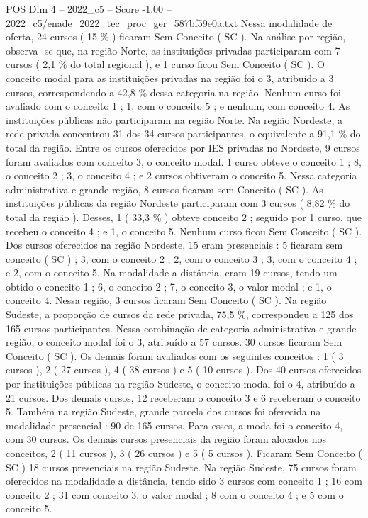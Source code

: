 \begin{textsample}{POS Dim 4 – 2022\_c5 – Score -1.00 – 2022\_c5/enade\_2022\_tec\_proc\_ger\_587bf59e0a.txt}
Nessa modalidade de oferta, 24 cursos ( 15 \% ) ficaram Sem Conceito ( SC ).
Na análise por região, observa -se que, na região Norte, as instituições privadas participaram com 7 cursos ( 2,1 \% do total regional ), e 1 curso ficou Sem Conceito ( SC ).
O conceito modal para as instituições privadas na região foi o 3, atribuído a 3 cursos, correspondendo a 42,8 \% dessa categoria na região.
Nenhum curso foi avaliado com o conceito 1 ; 1, com o conceito 5 ; e nenhum, com conceito 4.
As instituições públicas não participaram na região Norte.
Na região Nordeste, a rede privada concentrou 31 dos 34 cursos participantes, o equivalente a 91,1 \% do total da região.
Entre os cursos oferecidos por IES privadas no Nordeste, 9 cursos foram avaliados com conceito 3, o conceito modal. 1 curso obteve o conceito 1 ; 8, o conceito 2 ; 3, o conceito 4 ; e 2 cursos obtiveram o conceito 5.
Nessa categoria administrativa e grande região, 8 cursos ficaram sem Conceito ( SC ).
As instituições públicas da região Nordeste participaram com 3 cursos ( 8,82 \% do total da região ).
Desses, 1 ( 33,3 \% ) obteve conceito 2 ; seguido por 1 curso, que recebeu o conceito 4 ; e 1, o conceito 5.
Nenhum curso ficou Sem Conceito ( SC ).
Dos cursos oferecidos na região Nordeste, 15 eram presenciais : 5 ficaram sem conceito ( SC ) ; 3, com o conceito 2 ; 2, com o conceito 3 ; 3, com o conceito 4 ; e 2, com o conceito 5.
Na modalidade a distância, eram 19 cursos, tendo um obtido o conceito 1 ; 6, o conceito 2 ; 7, o conceito 3, o valor modal ; e 1, o conceito 4.
Nessa região, 3 cursos ficaram Sem Conceito ( SC ).
Na região Sudeste, a proporção de cursos da rede privada, 75,5 \%, correspondeu a 125 dos 165 cursos participantes.
Nessa combinação de categoria administrativa e grande região, o conceito modal foi o 3, atribuído a 57 cursos. 30 cursos ficaram Sem Conceito ( SC ).
Os demais foram avaliados com os seguintes conceitos : 1 ( 3 cursos ), 2 ( 27 cursos ), 4 ( 38 cursos ) e 5 ( 10 cursos ).
Dos 40 cursos oferecidos por instituições públicas na região Sudeste, o conceito modal foi o 4, atribuído a 21 cursos.
Dos demais cursos, 12 receberam o conceito 3 e 6 receberam o conceito 5.
Também na região Sudeste, grande parcela dos cursos foi oferecida na modalidade presencial : 90 de 165 cursos.
Para esses, a moda foi o conceito 4, com 30 cursos.
Os demais cursos presenciais da região foram alocados nos conceitos, 2 ( 11 cursos ), 3 ( 26 cursos ) e 5 ( 5 cursos ).
Ficaram Sem Conceito ( SC ) 18 cursos presenciais na região Sudeste.
Na região Sudeste, 75 cursos foram oferecidos na modalidade a distância, tendo sido 3 cursos com conceito 1 ; 16 com conceito 2 ; 31 com conceito 3, o valor modal ; 8 com o conceito 4 ; e 5 com o conceito 5.

\end{textsample}
